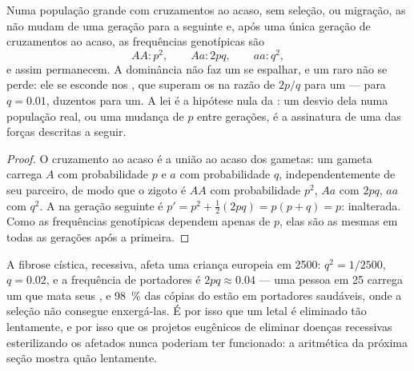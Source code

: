 \begin{theorem}\label{thm:b2:population-genetics:hw}
Numa população grande com cruzamentos ao acaso, sem seleção,  ou
migração, as  não mudam de uma geração para a
seguinte e, após uma única geração de cruzamentos ao acaso, as
frequências genotípicas são
\[
AA : p^{2}, \qquad Aa : 2pq, \qquad aa : q^{2},
\]
e assim permanecem. A dominância não faz um   se
espalhar, e um   raro não se perde: ele se esconde nos
, que superam os  na razão de $2p/q$ para um ---
para $q = 0.01$, duzentos para um. A lei é a hipótese nula da : um desvio dela numa população real, ou uma mudança de
$p$ entre gerações, é a assinatura de uma das forças descritas a
seguir.
\end{theorem}
\begin{proof}
O cruzamento ao acaso é a união ao acaso dos gametas: um gameta carrega
$A$ com probabilidade $p$ e $a$ com probabilidade $q$,
independentemente de seu parceiro, de modo que o zigoto é $AA$ com
probabilidade $p^{2}$, $Aa$ com $2pq$, $aa$ com $q^{2}$. A  na geração seguinte é $p' = p^{2} + \tfrac12(2pq) = p(p + q) = p$: inalterada.
Como as frequências genotípicas dependem apenas de $p$, elas são as
mesmas em todas as gerações após a primeira.
\end{proof}

\begin{example}\label{ex:b2:population-genetics:cf}
A fibrose cística, recessiva, afeta uma criança europeia em 2500:
$q^{2} = 1/2500$, $q = 0.02$, e a frequência de portadores é $2pq
\approx 0.04$ --- uma pessoa em 25 carrega um  que mata seus
, e \qty{98}{\%} das cópias do  estão em portadores
saudáveis, onde a seleção não consegue enxergá-las. É por isso que um
 letal é eliminado tão lentamente, e por isso que os projetos
eugênicos de eliminar doenças recessivas esterilizando os afetados
nunca poderiam ter funcionado: a aritmética da próxima seção mostra quão
lentamente.
\end{example}

